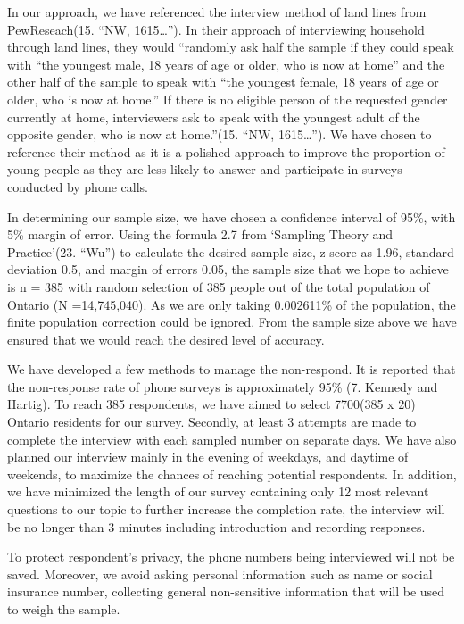 \documentclass[
]{article}
\begin{document}
In our approach, we have referenced the interview method of land lines
from PewReseach(15. ``NW, 1615\ldots{}''). In their approach of
interviewing household through land lines, they would ``randomly ask
half the sample if they could speak with ``the youngest male, 18 years
of age or older, who is now at home'' and the other half of the sample
to speak with ``the youngest female, 18 years of age or older, who is
now at home.'' If there is no eligible person of the requested gender
currently at home, interviewers ask to speak with the youngest adult of
the opposite gender, who is now at home.''(15. ``NW, 1615\ldots{}''). We
have chosen to reference their method as it is a polished approach to
improve the proportion of young people as they are less likely to answer
and participate in surveys conducted by phone calls.

In determining our sample size, we have chosen a confidence interval of
95\%, with 5\% margin of error. Using the formula 2.7 from `Sampling
Theory and Practice'(23. ``Wu'') to calculate the desired sample size,
z-score as 1.96, standard deviation 0.5, and margin of errors 0.05, the
sample size that we hope to achieve is n = 385 with random selection of
385 people out of the total population of Ontario (N =14,745,040). As we
are only taking 0.002611\% of the population, the finite population
correction could be ignored. From the sample size above we have ensured
that we would reach the desired level of accuracy.

We have developed a few methods to manage the non-respond. It is
reported that the non-response rate of phone surveys is approximately
95\% (7. Kennedy and Hartig). To reach 385 respondents, we have aimed to
select 7700(385 x 20) Ontario residents for our survey. Secondly, at
least 3 attempts are made to complete the interview with each sampled
number on separate days. We have also planned our interview mainly in
the evening of weekdays, and daytime of weekends, to maximize the
chances of reaching potential respondents. In addition, we have
minimized the length of our survey containing only 12 most relevant
questions to our topic to further increase the completion rate, the
interview will be no longer than 3 minutes including introduction and
recording responses.

To protect respondent's privacy, the phone numbers being interviewed
will not be saved. Moreover, we avoid asking personal information such
as name or social insurance number, collecting general non-sensitive
information that will be used to weigh the sample.
\end{document}
